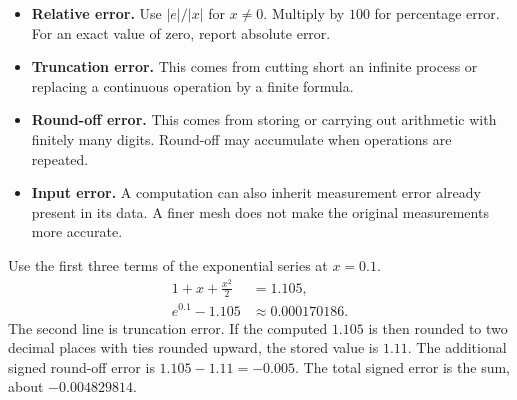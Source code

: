 \documentclass[12pt,a4paper]{article}
\begin{document}
\begin{itemize}[leftmargin=*, itemsep=3pt, topsep=4pt]
  \item \textbf{Relative error.} Use $|e|/|x|$ for $x\ne0$. Multiply by $100$ for percentage error. For an exact value of zero, report absolute error.
  \item \textbf{Truncation error.} This comes from cutting short an infinite process or replacing a continuous operation by a finite formula.
  \item \textbf{Round-off error.} This comes from storing or carrying out arithmetic with finitely many digits. Round-off may accumulate when operations are repeated.
  \item \textbf{Input error.} A computation can also inherit measurement error already present in its data. A finer mesh does not make the original measurements more accurate.
\end{itemize}
\begin{tcolorbox}[examplebox, title={Separate the two error sources}]
Use the first three terms of the exponential series at $x=0.1$.
\[
\begin{aligned}
1+x+\frac{x^2}{2}&=1.105,\\
e^{0.1}-1.105&\approx0.000170186.
\end{aligned}
\]
The second line is truncation error. If the computed $1.105$ is then rounded to two decimal places with ties rounded upward, the stored value is $1.11$. The additional signed round-off error is $1.105-1.11=-0.005$. The total signed error is the sum, about $-0.004829814$.
\end{tcolorbox}
\end{document}
